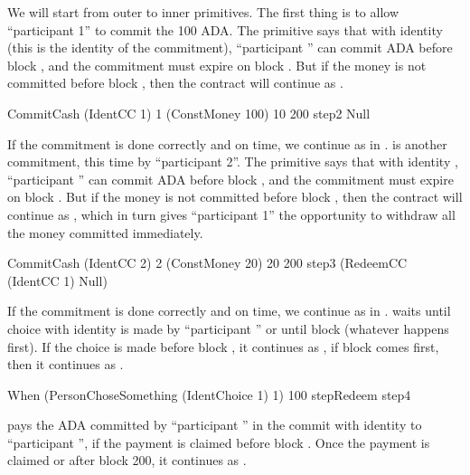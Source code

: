 \documentclass[
      acmsmall
    , screen
    , review=true
  ]{acmart}
\begin{document}
We will start from outer to inner primitives. The first thing is to allow ``participant 1'' to commit the 100 ADA. The 
primitive says that with identity  (this is the identity of the commitment), ``participant 
'' can commit  ADA before block , and the commitment must 
expire on block . But if the money is not committed before block , then the 
contract will continue as .

\begin{haskellcode}
CommitCash (IdentCC 1) 1 (ConstMoney 100) 10 200
           step2
           Null
\end{haskellcode}

If the commitment is done correctly and on time, we continue as in .  is 
another commitment, this time by ``participant 2''. The primitive says that with identity ,
``participant '' can commit  ADA before block , and the commitment
must expire on block . But if the money is not committed before block , then the
contract will continue as , which in turn gives ``participant 1'' the 
opportunity to withdraw all the money committed immediately.

\begin{haskellcode}
CommitCash (IdentCC 2) 2 (ConstMoney 20) 20 200
           step3
           (RedeemCC (IdentCC 1) Null)
\end{haskellcode}

If the commitment is done correctly and on time, we continue as in . 
waits until choice with identity  is made by ``participant '' or
until block  (whatever happens first). If the choice is made before block , 
it continues as , if block  comes first, then it continues as 
.

\begin{haskellcode}
When (PersonChoseSomething (IdentChoice 1) 1) 100
     stepRedeem
     step4
\end{haskellcode}

 pays the  ADA committed by ``participant '' in the commit with 
identity  to ``participant '', if the payment is claimed before block 
. Once the payment is claimed or after block 200, it continues as .
\end{document}
